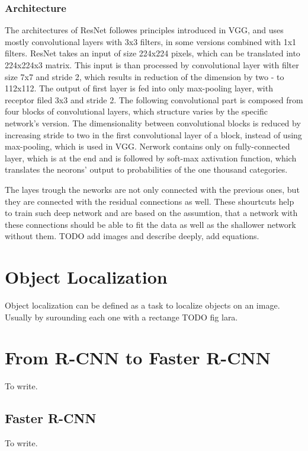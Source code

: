 \subsubsection{Architecture}
The architectures of ResNet followes principles introduced in VGG, and uses mostly convolutional
layers with 3x3 filters, in some versions combined with 1x1 filters. ResNet takes an input of
size 224x224 pixels, which can be translated into 224x224x3 matrix. This input is than processed
by convolutional layer with filter size 7x7 and stride 2, which results in reduction of the 
dimension by two - to 112x112. The output of first layer is fed into only max-pooling layer,
with receptor filed 3x3 and stride 2. The following convolutional part is composed from four
blocks of convolutional layers, which structure varies by the specific network's version.
The dimensionality between convolutional blocks is reduced by increasing stride to two
in the first convolutional layer of a block, instead of using max-pooling, which is used in VGG.
Nerwork contains only on fully-connected layer, which is at the end and is followed by 
soft-max axtivation function, which translates the neorons' output to probabilities of the
one thousand categories.


The layes trough the neworks are not only connected with the previous ones, but 
they are connected with the residual connections as well. These shourtcuts help to
train such deep network and are based on the assumtion, that a network with these
connections should be able to fit the data as well as the shallower network without them.
TODO add images and describe deeply, add equations. 





\section{Object Localization}
Object localization can be defined as a task to localize objects on an image. Usually
by surounding each one with a rectange TODO fig lara.

\section{From R-CNN to Faster R-CNN}
To write.


\subsection{Faster R-CNN}
To write.

